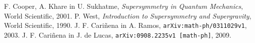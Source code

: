 \documentclass[a4paper, 12pt]{article}
\begin{document}


\tableofcontents

\pagebreak











%



\pagebreak
\begin{thebibliography}{9}
	F. Cooper, A. Khare in U. Sukhatme,
	\emph{Supersymmetry in Quantum Mechanics},
	World Scientific, 2001.
	P. West,
	\emph{Introduction to Supersymmetry and Supergravity},
	World Scientific, 1990.
	J. F. Cariñena in A. Ramos,
	\texttt{arXiv:math-ph/0311029v1},
	2003.
	J. F. Cariñena in J. de Lucas,
	\texttt{arXiv:0908.2235v1 [math-ph]},
	2009.
\end{thebibliography}
\end{document}
